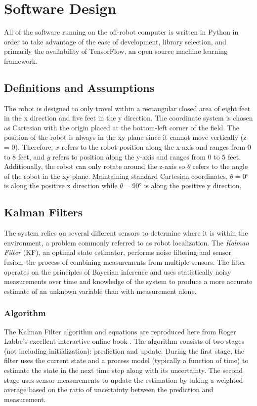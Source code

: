 \chapter{Software Design}
All of the software running on the off-robot computer is written in Python in order to take advantage of the ease of development, library selection, and primarily the availability of TensorFlow, an open source machine learning framework.

\section{Definitions and Assumptions}
The robot is designed to only travel within a rectangular closed area of eight feet in the x direction and five feet in the y direction. The coordinate system is chosen as Cartesian with the origin placed at the bottom-left corner of the field. The position of the robot is always in the xy-plane since it cannot move vertically (z = 0). Therefore, $x$ refers to the robot position along the x-axis and ranges from 0 to 8 feet, and $y$ refers to position along the y-axis and ranges from 0 to 5 feet. Additionally, the robot can only rotate around the z-axis so $\theta$ refers to the angle of the robot in the xy-plane. Maintaining standard Cartesian coordinates, $\theta=\ang{0}$ is along the positive x direction while $\theta=\ang{90}$ is along the positive y direction.

\section{Kalman Filters}
The system relies on several different sensors to determine where it is within the environment, a problem commonly referred to as robot localization. The \textit{Kalman Filter} (KF), an optimal state estimator, performs noise filtering and sensor fusion, the process of combining measurements from multiple sensors. The filter operates on the principles of Bayesian inference and uses statistically noisy measurements over time and knowledge of the system to produce a more accurate estimate of an unknown variable than with measurement alone.

\subsection{Algorithm}
The Kalman Filter algorithm and equations are reproduced here from Roger Labbe's excellent interactive online book \cite{labbe_2017}.  The algorithm consists of two stages (not including initialization): prediction and update. During the first stage, the filter uses the current state and a process model (typically a function of time) to estimate the state in the next time step along with its uncertainty. The second stage uses sensor measurements to update the estimation by taking a weighted average based on the ratio of uncertainty between the prediction and measurement. 

